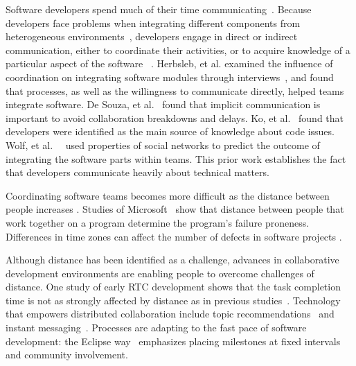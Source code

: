 Software developers spend much of their time
communicating~\cite{perry94}. Because developers face
problems when integrating different components from heterogeneous environments~\cite{redmiles2007:continuous},
developers engage in direct or indirect
communication, either to coordinate their activities, or to acquire knowledge of
a particular aspect of the software ~\cite{nakakoji2010:rdc}.
Herbsleb, et al. examined the influence of coordination on integrating software
modules through interviews~\cite{herbsleb1999:architectures}, and found that
processes, as well as the willingness to communicate directly, helped teams
integrate software. De Souza, et al.~\cite{desouza2007:awarenessnetwork} found that implicit
communication is important to avoid collaboration breakdowns and delays. Ko, et al.~\cite{ko:icse:2007} found that developers were identified as the main source of knowledge about code issues.
Wolf, et al.~~\cite{wolf:icse:2009} used properties of social networks to predict the outcome of integrating the software parts within teams.
This prior work establishes the fact that developers communicate heavily about technical matters.

Coordinating software teams becomes more difficult as the distance between people increases \cite{herbsleb:icse:2001}.
Studies of Microsoft~\cite{bird2009:dds_quality,nagappan:icse:2008}
show that distance between people that work together on a
program determine the program's failure proneness.
Differences in time zones can affect the number of defects in software projects \cite{cataldo2009:quality}.

Although distance has been identified as a challenge, advances in collaborative
development environments are enabling people to overcome challenges of distance.
One study of early RTC development
shows that the task completion time is not as strongly affected by distance as in previous studies~\cite{Nguyen:2008Distance}. Technology that empowers distributed collaboration include topic recommendations~\cite{carter2004} and instant messaging~\cite{niinimaki2008}. Processes are adapting to the fast pace of software development: the Eclipse way~\cite{frost:ieeesoftware:2007} emphasizes placing milestones at fixed intervals and community involvement.


